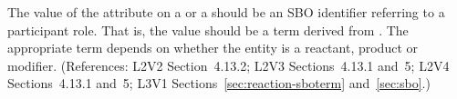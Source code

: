 The value of the  attribute on a \SpeciesReference or a
\ModifierSpeciesReference should be an SBO identifier referring to a
participant role.  That is, the value should be a term derived
from \sboparticipantrole.  The appropriate term depends on whether
the entity is a reactant, product or modifier.  (References: 
L2V2 Section~4.13.2; L2V3 Sections~4.13.1 and~5; L2V4 Sections~4.13.1 and~5;  
L3V1 Sections~\ref{sec:reaction-sboterm} and~\ref{sec:sbo}.)
